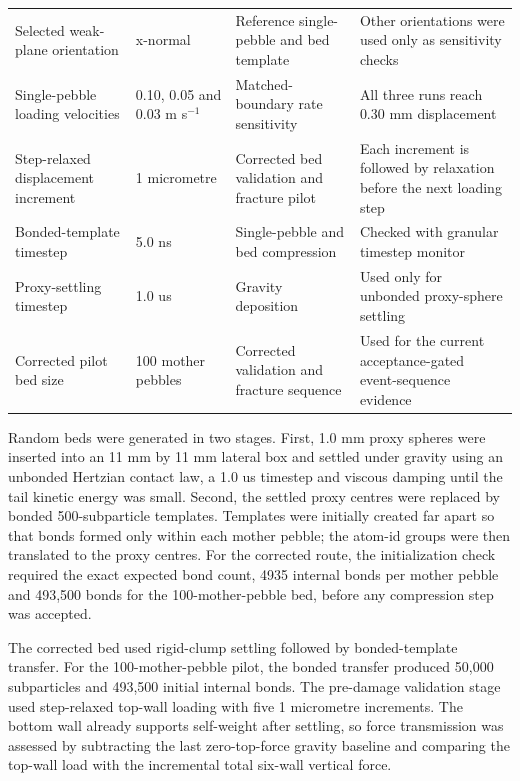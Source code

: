 \documentclass[5p,twocolumn]{elsarticle}
\begin{document}
\begin{strip}
{\begin{tabular}{llll}
Selected weak-plane orientation & x-normal & Reference single-pebble and bed template & Other orientations were used only as sensitivity checks \\
Single-pebble loading velocities & 0.10, 0.05 and 0.03 m s$^{-1}$ & Matched-boundary rate sensitivity & All three runs reach 0.30 mm displacement \\
Step-relaxed displacement increment & 1 micrometre & Corrected bed validation and fracture pilot & Each increment is followed by relaxation before the next loading step \\
Bonded-template timestep & 5.0 ns & Single-pebble and bed compression & Checked with granular timestep monitor \\
Proxy-settling timestep & 1.0 us & Gravity deposition & Used only for unbonded proxy-sphere settling \\
Corrected pilot bed size & 100 mother pebbles & Corrected validation and fracture sequence & Used for the current acceptance-gated event-sequence evidence \\
\bottomrule
\end{tabular}%
}
\vspace{-0.6\baselineskip}
\end{strip}


Random beds were generated in two stages. First, 1.0 mm proxy spheres were inserted into an 11 mm by 11 mm lateral box and settled under gravity using an unbonded Hertzian contact law, a 1.0 us timestep and viscous damping until the tail kinetic energy was small. Second, the settled proxy centres were replaced by bonded 500-subparticle templates. Templates were initially created far apart so that bonds formed only within each mother pebble; the atom-id groups were then translated to the proxy centres. For the corrected route, the initialization check required the exact expected bond count, 4935 internal bonds per mother pebble and 493,500 bonds for the 100-mother-pebble bed, before any compression step was accepted.


The corrected bed used rigid-clump settling followed by bonded-template transfer. For the 100-mother-pebble pilot, the bonded transfer produced 50,000 subparticles and 493,500 initial internal bonds. The pre-damage validation stage used step-relaxed top-wall loading with five 1 micrometre increments. The bottom wall already supports self-weight after settling, so force transmission was assessed by subtracting the last zero-top-force gravity baseline and comparing the top-wall load with the incremental total six-wall vertical force.
\end{document}
